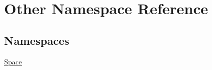 \hypertarget{namespace_other}{}\section{Other Namespace Reference}
\label{namespace_other}
\subsection*{Namespaces}
\begin{DoxyCompactItemize}
\item 
 \mbox{\hyperlink{namespace_other_1_1_space}{Space}}
\end{DoxyCompactItemize}
